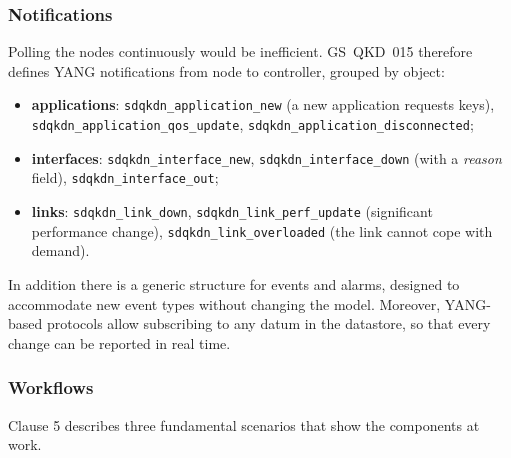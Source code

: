 \subsubsection{Notifications}

Polling the nodes continuously would be inefficient. GS~QKD~015 therefore
defines YANG notifications from node to controller, grouped by object:
\begin{itemize}
  \item \textbf{applications}: \texttt{sdqkdn\_application\_new} (a new
        application requests keys), \texttt{sdqkdn\_application\_qos\_update},
        \texttt{sdqkdn\_application\_disconnected};
  \item \textbf{interfaces}: \texttt{sdqkdn\_interface\_new},
        \texttt{sdqkdn\_interface\_down} (with a \emph{reason} field),
        \texttt{sdqkdn\_interface\_out};
  \item \textbf{links}: \texttt{sdqkdn\_link\_down},
        \texttt{sdqkdn\_link\_perf\_update} (significant performance change),
        \texttt{sdqkdn\_link\_overloaded} (the link cannot cope with demand).
\end{itemize}
In addition there is a generic structure for events and alarms, designed to
accommodate new event types without changing the model. Moreover,
YANG-based protocols allow subscribing to any datum in the datastore, so
that every change can be reported in real time.

\subsubsection{Workflows}

Clause 5 describes three fundamental scenarios that show the components at
work.

